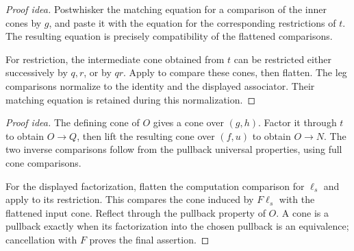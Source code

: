 \documentclass[11pt]{article}
\begin{document}
\begin{proof}[Proof idea]
Postwhisker the matching equation for a comparison of the inner cones by
$g$, and paste it with the equation for the corresponding restrictions
of $t$. The resulting equation is precisely compatibility of the
flattened comparisons.

For restriction, the intermediate cone obtained from $t$ can be restricted
either successively by $q,r$, or by $qr$.
Apply  to compare these cones,
then flatten. The leg comparisons normalize to the identity and the
displayed associator. Their matching equation is retained during this normalization.
\end{proof}

\begin{proof}[Proof idea]
The defining cone of $O$ gives a cone over $(g,h)$. Factor it through $t$
to obtain $O\to Q$, then lift the resulting cone over $(f,u)$ to obtain
$O\to N$. The two inverse comparisons follow from the pullback universal
properties, using full cone comparisons.

For the displayed factorization, flatten the computation comparison for
$\ell_s$ and apply  to its restriction.
This compares the cone induced by $F\ell_s$ with the flattened input cone.
Reflect through the pullback property of $O$. A cone is a pullback exactly
when its factorization into the chosen pullback is an equivalence;
cancellation with $F$ proves the final assertion.
\end{proof}
\end{document}
